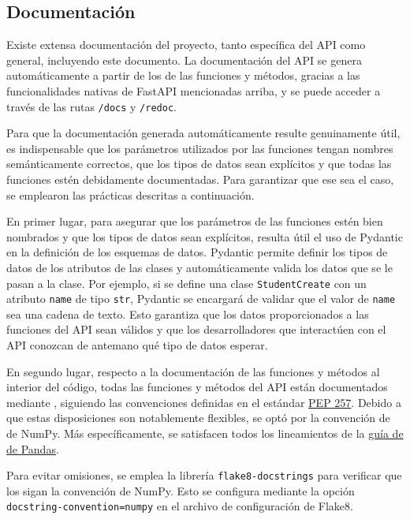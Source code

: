\subsection{Documentación}

Existe extensa documentación del proyecto, tanto específica del API como general, incluyendo este documento. La documentación del \gls{API} se genera automáticamente a partir de los  de las funciones y métodos, gracias a las funcionalidades nativas de \gls{FastAPI} mencionadas arriba, y se puede acceder a través de las rutas \verb|/docs| y \verb|/redoc|.

Para que la documentación generada automáticamente resulte genuinamente útil, es indispensable que los parámetros utilizados por las funciones tengan nombres semánticamente correctos, que los tipos de datos sean explícitos y que todas las funciones estén debidamente documentadas. Para garantizar que ese sea el caso, se emplearon las prácticas descritas a continuación.

En primer lugar, para asegurar que los parámetros de las funciones estén bien nombrados y que los tipos de datos sean explícitos, resulta útil el uso de \gls{Pydantic} en la definición de los esquemas de datos. \gls{Pydantic} permite definir los tipos de datos de los atributos de las clases y automáticamente valida los datos que se le pasan a la clase. Por ejemplo, si se define una clase \lstinline|StudentCreate| con un atributo \lstinline|name| de tipo \lstinline|str|, \gls{Pydantic} se encargará de validar que el valor de \lstinline|name| sea una cadena de texto. Esto garantiza que los datos proporcionados a las funciones del \gls{API} sean válidos y que los desarrolladores que interactúen con el \gls{API} conozcan de antemano qué tipo de datos esperar.

En segundo lugar, respecto a la documentación de las funciones y métodos al interior del código, todas las funciones y métodos del \gls{API} están documentados mediante , siguiendo las convenciones definidas en el estándar \href{https://peps.python.org/pep-0257/}{\gls{PEP} 257}. Debido a que estas disposiciones son notablemente flexibles, se optó por la convención de  de \gls{NumPy}. Más específicamente, se satisfacen todos los lineamientos de la \href{https://python-sprints.github.io/pandas/guide/pandas_docstring.html}{guía de  de \gls{Pandas}}.

Para evitar omisiones, se emplea la librería \verb|flake8-docstrings| para verificar que los  sigan la convención de \gls{NumPy}. Esto se configura mediante la opción \verb|docstring-convention=numpy| en el archivo de configuración de \gls{Flake8}.

